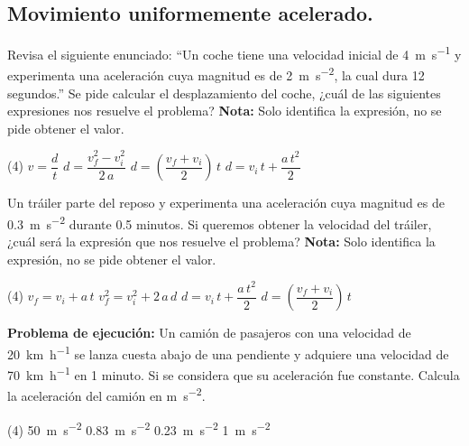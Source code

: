 \documentclass[12pt, letter]{exam}
\begin{document}


\newpage

\begin{questions}
    \section{Movimiento uniformemente acelerado.}

    \question Revisa el siguiente enunciado: \enquote{Un coche tiene una velocidad inicial de \SI{4}{\meter\per\second} y experimenta una aceleración cuya magnitud es de \SI{2}{\meter\per\square\second}, la cual dura \num{12} segundos.} Se pide calcular el desplazamiento del coche, ¿cuál de las siguientes expresiones nos resuelve el problema? \textbf{Nota: } Solo identifica la expresión, no se pide obtener el valor.
    \begin{tasks}(4)
        \task $v = \dfrac{d}{t}$
        \task $d = \dfrac{v_{f}^{2} - v_{i}^{2}}{2 \, a}$
        \task $d = \left( \dfrac{v_{f} + v_{i}}{2} \right) \, t$
        \task $d = v_{i} \, t + \dfrac{a \, t^{2}}{2}$
    \end{tasks}
    \question Un tráiler parte del reposo y experimenta una aceleración cuya magnitud es de \SI{0.3}{\meter\per\square\second} durante \num{0.5} minutos. Si queremos obtener la velocidad del tráiler, ¿cuál será la expresión que nos resuelve el problema? \textbf{Nota: } Solo identifica la expresión, no se pide obtener el valor.
    \begin{tasks}(4)
        \task $v_{f} = v_{i} + a \, t$
        \task $v_{f}^{2} = v_{i}^{2} + 2\, a \, d$
        \task $d = v_{i} \, t + \dfrac{a \, t^{2}}{2}$
        \task $d = \left( \dfrac{v_{f} + v_{i}}{2} \right) \, t$
    \end{tasks}
    \question \label{Problema_01} \textbf{Problema de ejecución:} Un camión de pasajeros con una velocidad de \SI{20}{\kilo\meter\per\hour} se lanza cuesta abajo de una pendiente y adquiere una velocidad de \SI{70}{\kilo\meter\per\hour} en \num{1} minuto. Si se considera que su aceleración fue constante. Calcula la aceleración del camión en \unit{\meter\per\square\second}.
    \begin{tasks}(4)
        \task \SI{50}{\meter\per\square\second}
        \task \SI{0.83}{\meter\per\square\second}
        \task \SI{0.23}{\meter\per\square\second}
        \task \SI{1}{\meter\per\square\second}
    \end{tasks}


\end{questions}
\end{document}
